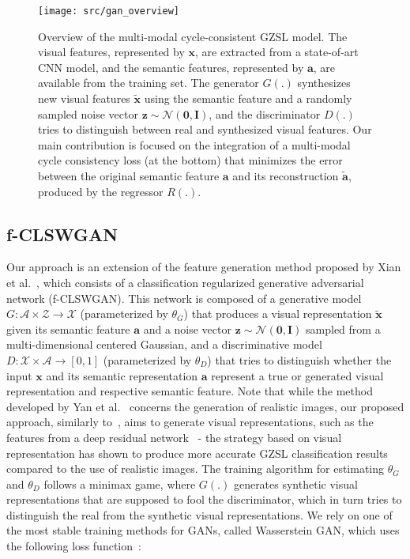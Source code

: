 \documentclass[runningheads]{llncs}
\begin{document}
\begin{figure}[h]
\centering
\texttt{[image: src/gan\_overview]}
\caption{Overview of the multi-modal cycle-consistent GZSL model. 
The visual features, represented by $\mathbf{x}$, are extracted from a state-of-art CNN model, and the semantic features, represented by $\mathbf{a}$, are available from the training set.  The generator $G(.)$ synthesizes new visual features $\widetilde{\mathbf{x}}$ using the semantic feature and a randomly sampled noise vector $\mathbf{z} \sim \mathcal{N}(\mathbf{0},\mathbf{I})$, and the discriminator $D(.)$ tries to distinguish between real and synthesized visual features.  Our main contribution is focused on the integration of a multi-modal cycle consistency loss (at the bottom) that minimizes the error between the original semantic feature $\mathbf{a}$ and its reconstruction $\widetilde{\mathbf{a}}$, produced by the regressor $R(.)$.}
\label{fig:overview}

\end{figure}

\subsection{f-CLSWGAN}
\label{sec:CLSWGAN}

Our approach is an extension of the feature generation method proposed by Xian et al.~\cite{XianCVPR2018}, which consists of a classification regularized generative adversarial network (f-CLSWGAN). This network is composed of a generative model $G:\mathcal{A} \times \mathcal{Z} \rightarrow \mathcal{X}$ (parameterized by $\theta_G$) that produces a visual representation $\widetilde{\mathbf{x}}$ given its semantic feature $\mathbf{a}$ and a noise vector $\mathbf{z} \sim \mathcal{N}(\mathbf{0},\mathbf{I})$ sampled from a multi-dimensional centered Gaussian, and a discriminative model $D:\mathcal{X} \times \mathcal{A} \rightarrow [0,1]$ (parameterized by $\theta_D$) that tries to distinguish whether the input $\mathbf{x}$ and its semantic representation $\mathbf{a}$ represent a true or generated visual representation and respective semantic feature.  
Note that while the method developed by Yan et al.~\cite{yan2016attribute2image} concerns the generation of realistic images, our proposed approach, similarly to~\cite{XianCVPR2018,long2017zero,bucher2017generating}, aims to generate visual representations, such as the features from a deep residual network~\cite{he2016resnet} - the strategy based on visual representation has shown to produce more accurate GZSL classification results compared to the use of realistic images.  
The training algorithm for estimating $\theta_G$ and $\theta_D$ follows a minimax game, where $G(.)$ generates synthetic visual representations that are supposed to fool the discriminator, which in turn tries to distinguish the real from the synthetic visual representations.  We rely on one of the most stable training methods for GANs, called Wasserstein GAN, which uses the following loss function~\cite{arjovsky2017wasserstein}:
\end{document}
